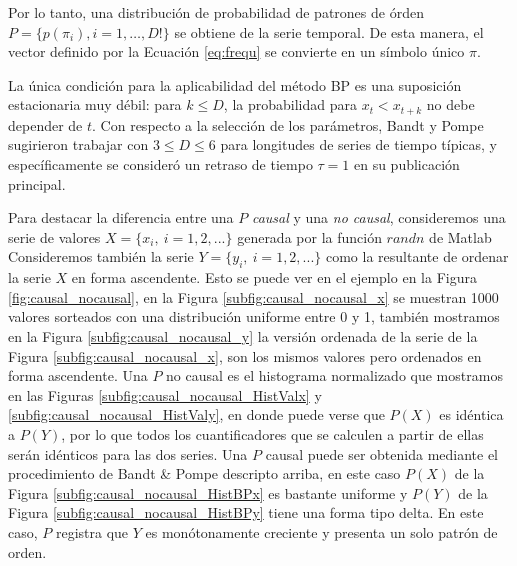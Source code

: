 Por lo tanto, una distribución de probabilidad de patrones de órden $P = \{ p(\pi_i), i = 1, \dots, D! \}$ se obtiene de la serie temporal.
De esta manera, el vector definido por la Ecuación \ref{eq:frequ} se convierte en un símbolo único $\pi$.

La única condición para la aplicabilidad del método BP es una suposición estacionaria muy débil: para $k \leq D$, la probabilidad para $x_t<x_{t + k}$ no debe depender de $t$.
Con respecto a la selección de los parámetros, Bandt y Pompe sugirieron trabajar con $3 \leq D \leq 6$ para longitudes de series de tiempo típicas, y específicamente se consideró un retraso de tiempo $\tau = 1$ en su publicación principal.

Para destacar la diferencia entre una $P$ \textit{causal} y una \textit{no causal}, consideremos una serie de valores $X=\{x_i,~i=1,2,...\}$ generada por la función $randn$ de Matlab
Consideremos también la serie $Y=\{y_i,~i=1,2,...\}$ como la resultante de ordenar la serie $X$ en forma ascendente. Esto se puede ver en el ejemplo en la Figura \ref{fig:causal_nocausal}, en la Figura \ref{subfig:causal_nocausal_x} se muestran 1000 valores sorteados con una distribución uniforme entre 0 y 1, también mostramos en la Figura \ref{subfig:causal_nocausal_y} la versión ordenada de la serie de la Figura \ref{subfig:causal_nocausal_x}, son los mismos valores pero ordenados en forma ascendente. Una $P$ no causal es el histograma normalizado que mostramos en las Figuras \ref{subfig:causal_nocausal_HistValx} y \ref{subfig:causal_nocausal_HistValy}, en donde puede verse que $P(X)$ es idéntica a $P(Y)$, por lo que todos los cuantificadores que se calculen a partir de ellas serán idénticos para las dos series. Una $P$ causal puede ser obtenida mediante el procedimiento de Bandt \& Pompe descripto arriba, en este caso $P(X)$ de la Figura \ref{subfig:causal_nocausal_HistBPx} es bastante uniforme y $P(Y)$ de la Figura \ref{subfig:causal_nocausal_HistBPy} tiene una forma tipo delta. En este caso, $P$ registra que $Y$ es monótonamente creciente y presenta un solo patrón de orden.

